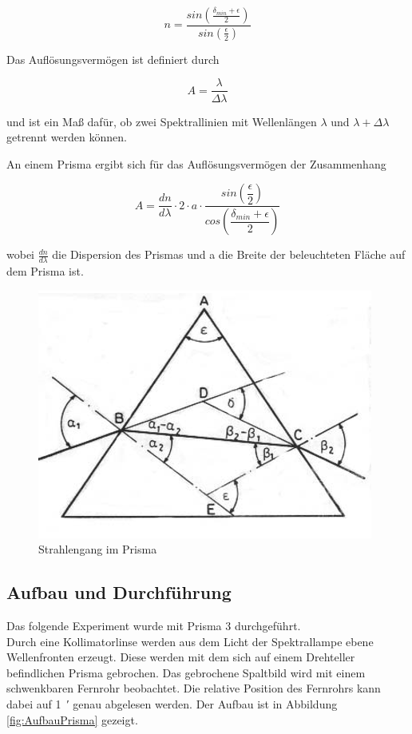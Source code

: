 \documentclass[12pt,a4paper]{article}
\begin{document}
	\begin{equation}
	n = \frac{sin(\frac{\delta_{min}+\epsilon}{2})}{sin(\frac{\epsilon}{2})}
	\end{equation}
	
	Das Auflösungsvermögen ist definiert durch
	
	\begin{equation}
	A = \frac{\lambda}{\Delta \lambda}
	\end{equation} 
	
	und ist ein Maß dafür, ob zwei Spektrallinien mit Wellenlängen $\lambda$ und $\lambda + \Delta \lambda$ getrennt werden können.
	
	An einem Prisma ergibt sich für das Auflösungsvermögen der Zusammenhang
	
\begin{equation}
A = \dfrac{dn}{d\lambda}\cdot 2\cdot a\cdot\dfrac{sin\left(\dfrac{\epsilon}{2}\right)}{cos\left(\dfrac{\delta_{min}+\epsilon}{2}\right)}
\label{eq:Auflosung}
\end{equation}
	
	wobei $\frac{dn}{d\lambda}$ die Dispersion des Prismas und a die Breite der beleuchteten Fläche auf dem Prisma ist.

\begin{figure}
\centering
\includegraphics[scale=1.1]{Bilder/prisma}
\caption{Strahlengang im Prisma}
\label{fig:Prisma}
\end{figure}

	
	
\subsection{Aufbau und Durchführung}
Das folgende Experiment wurde mit Prisma 3 durchgeführt.\\
Durch eine Kollimatorlinse werden aus dem Licht der Spektrallampe ebene Wellenfronten erzeugt. Diese werden mit dem sich auf einem Drehteller befindlichen Prisma gebrochen. Das gebrochene Spaltbild wird mit einem schwenkbaren Fernrohr beobachtet. Die relative Position des Fernrohrs kann dabei auf \SI{1}{\arcminute} genau abgelesen werden.
Der Aufbau ist in Abbildung \ref{fig:AufbauPrisma} gezeigt.
	
\end{document}
